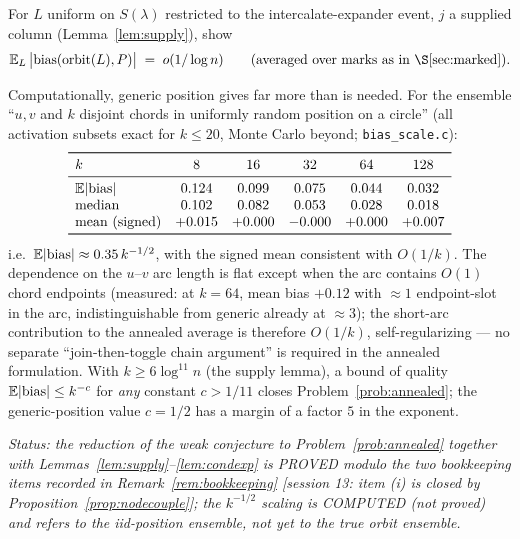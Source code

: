 \begin{problem}
\label{prob:annealed}
For $L$ uniform on $S(\lambda)$ restricted to the intercalate-expander
event, $j$ a supplied column (Lemma~\ref{lem:supply}), show
\[
\E_L\,\bigl|\mathrm{bias}(\mathrm{orbit}(L),P)\bigr|
\;=\;o(1/\log n)
\qquad\text{(averaged over marks as in \S\ref{sec:marked})}.
\]
\end{problem}

Computationally, generic position gives far more than is needed.  For
the ensemble ``$u,v$ and $k$ disjoint chords in uniformly random
position on a circle'' (all activation subsets exact for $k\le20$,
Monte Carlo beyond; \texttt{bias\_scale.c}):
\[
\begin{array}{lccccc}
\toprule
k & 8 & 16 & 32 & 64 & 128\\
\midrule
\E|\mathrm{bias}| & 0.124 & 0.099 & 0.075 & 0.044 & 0.032\\
\text{median} & 0.102 & 0.082 & 0.053 & 0.028 & 0.018\\
\text{mean (signed)} & +0.015 & +0.000 & -0.000 & +0.000 & +0.007\\
\bottomrule
\end{array}
\]
i.e.\ $\mathbb{E}|\mathrm{bias}|\approx0.35\,k^{-1/2}$, with the signed mean
consistent with $O(1/k)$.  The dependence on the $u$--$v$ arc length
is flat except when the arc contains $O(1)$ chord endpoints (measured:
at $k=64$, mean bias $+0.12$ with $\approx1$ endpoint-slot in the
arc, indistinguishable from generic already at $\approx3$); the
short-arc contribution to the annealed average is therefore
$O(1/k)$, self-regularizing --- no separate ``join-then-toggle chain
argument'' is required in the annealed formulation.  With
$k\ge6\log^{11}n$ (the supply lemma), a bound of quality
$\mathbb{E}|\mathrm{bias}|\le k^{-c}$ for \emph{any} constant $c>1/11$ closes
Problem~\ref{prob:annealed}; the generic-position value $c=1/2$ has a
margin of a factor $5$ in the exponent.

\emph{Status: the reduction of the weak conjecture to
Problem~\ref{prob:annealed} together with
Lemmas~\ref{lem:supply}--\ref{lem:condexp} is PROVED modulo the two
bookkeeping items recorded in Remark~\ref{rem:bookkeeping} [session 13:
item (i) is closed by Proposition~\ref{prop:nodecouple}]; the
$k^{-1/2}$ scaling is COMPUTED (not proved) and refers to the
iid-position ensemble, not yet to the true orbit ensemble.}

